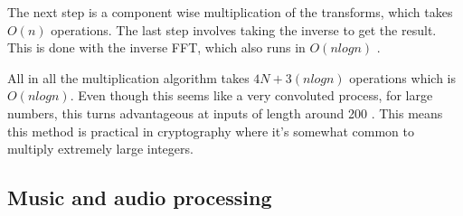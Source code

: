 The next step is a component wise multiplication of the transforms, which takes $O(n)$ operations. The last step involves taking the inverse to get the result. This is done with the inverse FFT, which also runs in $O(nlogn)$ \cite{Reducible2020}.

All in all the multiplication algorithm takes $4N + 3(nlogn)$ operations which is $O(nlogn)$. Even though this seems like a very convoluted process, for large numbers, this turns advantageous at inputs of length around 200 \cite{Emerencia2007}. This means this method is practical in cryptography where it's somewhat common to multiply extremely large integers. 



\subsection{Music and audio processing}